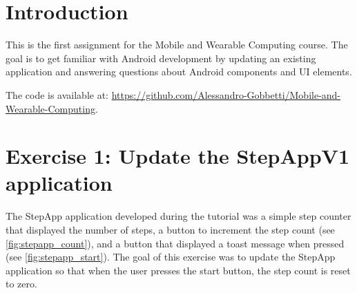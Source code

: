 \documentclass{usireport}
\begin{document}
\maketitlepage

\section{Introduction}
This is the first assignment for the Mobile and Wearable Computing course. The goal is to get familiar with Android development by updating an existing application and answering questions about Android components and UI elements. 

The code is available at: \url{https://github.com/Alessandro-Gobbetti/Mobile-and-Wearable-Computing}.

\section{Exercise 1: Update the StepAppV1 application}

The StepApp application developed during the tutorial was a simple step counter that displayed the number of steps, a button to increment the step count (see \autoref{fig:stepapp_count}), and a button that displayed a toast message when pressed (see \autoref{fig:stepapp_start}). The goal of this exercise was to update the StepApp application so that when the user presses the start button, the step count is reset to zero.
\end{document}
